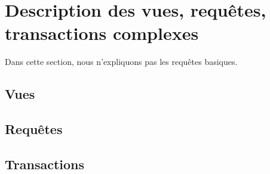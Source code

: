 \section{Description des vues, requêtes, transactions complexes}

Dans cette section, nous n'expliquons pas les requêtes basiques.

\subsection{Vues}

\subsection{Requêtes}

\subsection{Transactions}

